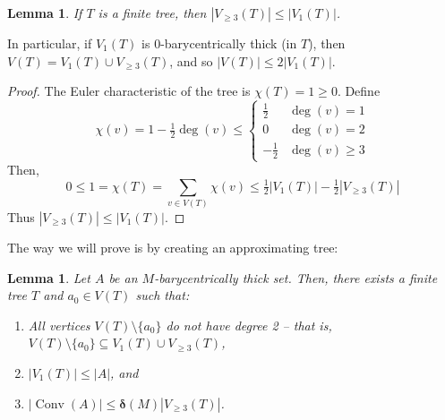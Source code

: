 \documentclass{amsart}
\numberwithin{equation}{section}
\newtheorem{lemma}[theorem]{Lemma}
\theoremstyle{definition}
\newcommand{\bdelta}{{\boldsymbol\delta}}
\DeclareMathOperator{\conv}{Conv}
\begin{document}
  \begin{lemma}\label{isoperimetric inequality for a tree}
        If $T$ is a finite tree,  then $|V_{\ge 3}(T)| \le  |V_1(T)|$.
    \end{lemma}

    In particular, if $V_1(T)$ is $0$-barycentrically thick (in $T$), then $V(T) = V_1(T) \cup V_{\ge 3}(T)$, and so $|V(T)|\le 2|V_1(T)|$.


    \begin{proof}
        The Euler characteristic of the tree is $\chi(T)=1\ge 0$.
        Define \[\chi(v) = 1-\tfrac12 \deg(v) \le \begin{cases} \tfrac12 &\deg(v)=1 \\ 0 &\deg(v)=2 \\ -\tfrac12 &\deg(v)\ge 3\end{cases}\]
        Then,
        \[
        0\le 1 = \chi(T) = \sum_{v\in V(T)} \chi(v)  \le \tfrac12 |V_1(T)| - \tfrac12 |V_{\ge 3}(T)|
        \]
        Thus  $|V_{\ge 3}(T)| \le |V_1(T)|.$
    \end{proof}
    
The way we will prove  is by creating an approximating tree:
    
    \begin{lemma}\label{approximating tree}
        Let $A$ be an $M$-barycentrically thick set. Then, there exists a finite tree $T$ and $a_0\in V(T)$ such that:
    \begin{enumerate}[label=(T\arabic*)]
        \item \label{T has no deg 2} All vertices $V(T)\setminus \{a_0\}$ do not have degree 2 -- that is, $V(T) \setminus \{a_0\} \subseteq  V_1(T)\cup V_{\ge 3}(T)$,
        \item \label{leaves of T}  $|V_1(T)|\le |A|$, and
        \item \label{T covers C}  $|\conv(A)| \le \bdelta(M)|V_{\ge 3}(T)|$.
    \end{enumerate}
    \end{lemma}
\end{document}
